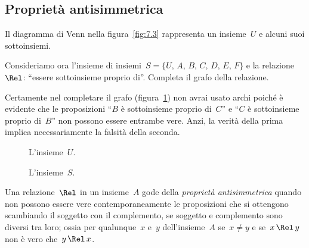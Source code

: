 \ovalbox{\risolvi \ref{ese:\thechapter.20}}

\subsection{Proprietà antisimmetrica}

\begin{exrig}
 \begin{esempio}

Il diagramma di Venn nella figura~\ref{fig:7.3} rappresenta un insieme~$U$ e alcuni suoi sottoinsiemi.

Consideriamo ora l'insieme di insiemi~$S = \{U\text{,~}A\text{,~}B\text{,~}C\text{,~}D\text{,~}E\text{,~}F\}$ e la relazione~$\Rel$: ``essere sottoinsieme proprio di''.
Completa il grafo della relazione.

Certamente nel completare il grafo (figura~\ref{fig:7.4}) non avrai usato archi poiché è evidente che le proposizioni ``$B$ è sottoinsieme proprio di~$C$'' e ``$C$
è sottoinsieme proprio di~$B$'' non possono essere entrambe vere. Anzi, la verità della prima implica necessariamente la falsità della seconda.
 \end{esempio}
\end{exrig}

\begin{figure}[hb]
\begin{minipage}[b]{.45\textwidth}
 \centering
 
 \caption{L'insieme~$U$.}\label{fig:7.3}
\end{minipage}\hfil
\begin{minipage}[b]{.45\textwidth}
 \centering
 
 \caption{L'insieme~$S$.}\label{fig:7.4}
\end{minipage}
\end{figure}

\begin{definizione}
Una relazione~$\Rel$ in un insieme~$A$ gode della \emph{proprietà antisimmetrica} quando non possono essere vere
contemporaneamente le proposizioni che si ottengono scambiando il soggetto con il complemento, se soggetto e complemento sono diversi
tra loro; ossia per qualunque~$x$ e~$y$ dell'insieme~$A$ se~$x \neq y$ e se~$x \,\Rel\, y$ non è vero che~$y \,\Rel\, x$.
\end{definizione}

\ovalbox{\risolvi \ref{ese:\thechapter.21}}

